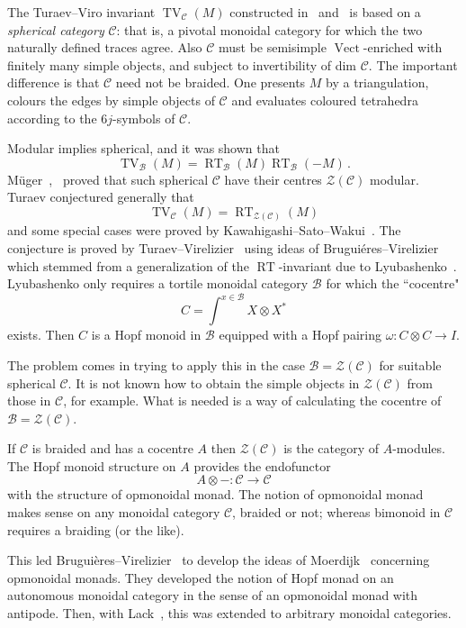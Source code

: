 \documentclass[a4paper,12pt]{article}
\theoremstyle{definition}
\theoremstyle{fact}
\theoremstyle{genquest}
\theoremstyle{step}
\newcommand{\catB}{\mathcal{B}}
\newcommand{\catC}{\mathcal{C}}
\newcommand{\RT}{\operatorname{RT}}
\newcommand{\TV}{\operatorname{TV}}
\newcommand{\Vect}{\operatorname{Vect}}
\newcommand{\catZ}{\mathcal{Z}}%
\newcommand{\longto}{\longrightarrow}
\begin{document}
The Turaev--Viro invariant $\TV_\catC(M)$ constructed in~\cite{TuraevYa1992} and~\cite{BarWest1996} is based on a \emph{spherical category} $\catC$: that is, a pivotal monoidal category for which the two naturally defined traces agree.   
Also $\catC$ must be semisimple $\Vect$-enriched with finitely many simple objects, and subject to invertibility of dim $\catC$. 
The important difference is that $\catC$ need not be braided.   
One presents $M$ by a triangulation, colours the edges by simple objects of $\catC$ and evaluates coloured tetrahedra according to the $6j$-symbols of $\catC$. 
 
 Modular implies spherical, and it was shown that
 \[
 \TV_\catB (M) = \RT_\catB (M) \RT_\catB (-M)\,.
 \]
M\"uger~\cite{Muger2003a},~\cite{Muger2003b} proved that such spherical $\catC$ have their centres $\catZ(\catC)$ modular.   
%
Turaev conjectured generally that
 \[
 \TV_\catC (M) = \RT_{\catZ(\catC)} (M)
 \]
and some special cases were proved by Kawahigashi--Sato--Wakui~\cite{KSW2005}. 
The conjecture is proved by Turaev--Virelizier~\cite{TurVirez} using ideas of Brugui\'eres--Virelizier~\cite{BrugVirel2008} which stemmed from a generalization of the $\RT$-invariant due to Lyubashenko~\cite{Lyub1995}. 
Lyubashenko only requires a tortile monoidal category $\catB$ for which the ``cocentre" 
 \[
 C = \int^{x\in\catB} X \otimes X^\ast
 \]
 exists. Then $C$ is a Hopf monoid in $\catB$ equipped with a Hopf pairing $\omega : C \otimes C \to I$.
 
The problem comes in trying to apply this in the case $\catB = \catZ(\catC)$ for suitable spherical $\catC$.   
It is not known how to obtain the simple objects in $\catZ(\catC)$ from those in $\catC$, for example.    
What is needed is a way of calculating the cocentre of $\catB = \catZ(\catC)$.
 
 
 If $\catC$ is braided and has a cocentre $A$ then $\catZ(\catC)$ is the category of $A$-modules.   
 The Hopf monoid structure on $A$ provides the endofunctor
 \[
 A\otimes -: \catC \longto \catC
 \]
 with the structure of opmonoidal monad.   
 The notion of opmonoidal monad makes sense on any monoidal category $\catC$, braided or not; 
 whereas bimonoid in $\catC$ requires a braiding (or the like).
 
This led Brugui\`eres--Virelizier~\cite{BrugVirel2007} to develop the ideas of Moerdijk~\cite{Moerdijk2002} concerning opmonoidal monads. 
They developed the notion of Hopf monad on an autonomous monoidal category in the sense of an opmonoidal monad with antipode.   
Then, with Lack~\cite{BrugVirelLack}, this was extended to arbitrary monoidal categories. 
 
\end{document}
